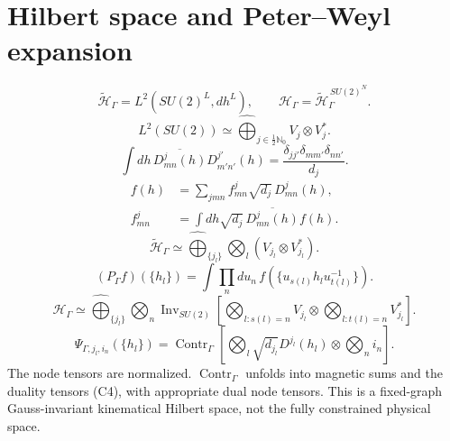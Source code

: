 \documentclass[11pt,a4paper]{article}
\newcommand{\Inv}{\operatorname{Inv}}
\newcommand{\Contr}{\operatorname{Contr}}
\newcommand{\eq}[2]{\begin{equation}#2\tag{#1}\end{equation}}
\begin{document}
\section{Hilbert space and Peter--Weyl expansion}
\eq{S1}{\widetilde{\mathcal H}_\Gamma=L^2(SU(2)^L,dh^L),\qquad\mathcal H_\Gamma=\widetilde{\mathcal H}_\Gamma^{\,SU(2)^N}.}
\eq{S2}{L^2(SU(2))\simeq\widehat{\bigoplus}_{j\in\frac12\mathbb N_0}V_j\otimes V_j^*.}
\eq{S3}{\int dh\,\overline{D^j_{mn}(h)}D^{j'}_{m'n'}(h)=\frac{\delta_{jj'}\delta_{mm'}\delta_{nn'}}{d_j}.}
\eq{S4}{\begin{aligned}
f(h)&=\sum_{jmn}f^j_{mn}\sqrt{d_j}\,D^j_{mn}(h),\\
f^j_{mn}&=\int dh\sqrt{d_j}\,\overline{D^j_{mn}(h)}f(h).
\end{aligned}}
\eq{S5}{\widetilde{\mathcal H}_\Gamma\simeq\widehat{\bigoplus}_{\{j_l\}}\bigotimes_l(V_{j_l}\otimes V_{j_l}^*).}
\eq{S6}{(P_\Gamma f)(\{h_l\})=\int\prod_n du_n\,f(\{u_{s(l)}h_lu_{t(l)}^{-1}\}).}
\eq{S7}{\boxed{\mathcal H_\Gamma\simeq\widehat{\bigoplus}_{\{j_l\}}\bigotimes_n\Inv_{SU(2)}\left[\bigotimes_{l:s(l)=n}V_{j_l}\otimes\bigotimes_{l:t(l)=n}V_{j_l}^*\right].}}
\eq{S8}{\Psi_{\Gamma,j_l,i_n}(\{h_l\})=\Contr_\Gamma\left[\bigotimes_l\sqrt{d_{j_l}}D^{j_l}(h_l)\otimes\bigotimes_n i_n\right].}
The node tensors are normalized. $\Contr_\Gamma$ unfolds into magnetic sums and the duality tensors (C4), with appropriate dual node tensors. This is a fixed-graph Gauss-invariant kinematical Hilbert space, not the fully constrained physical space.
\end{document}
